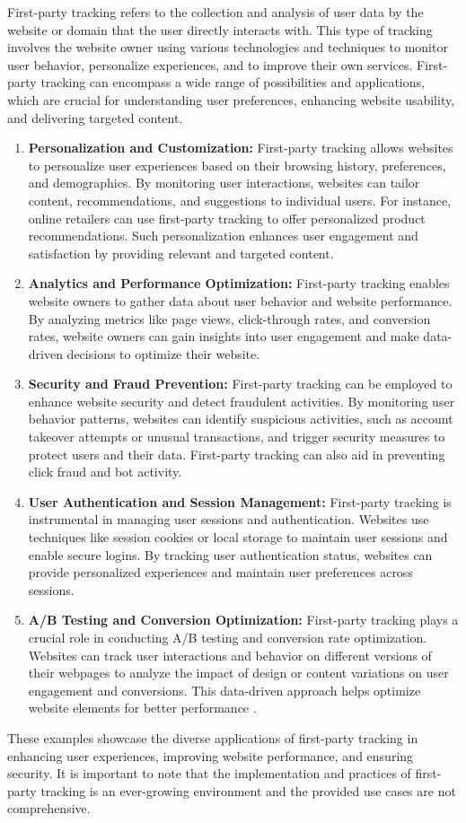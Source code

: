 First-party tracking refers to the collection and analysis of user data by the website or domain that the user directly
interacts with. This type of tracking involves the website owner using various technologies and techniques to monitor user
behavior, personalize experiences, and to improve their own services. First-party tracking can encompass a wide range of
possibilities and applications, which are crucial for understanding user preferences, enhancing website usability,
and delivering targeted content.
\begin{enumerate}
  \item{\textbf{Personalization and Customization:} First-party tracking allows websites to personalize user experiences based on their browsing history,
    preferences, and demographics. By monitoring user interactions, websites can tailor content,
    recommendations, and suggestions to individual users. For instance, online retailers can use first-party
    tracking to offer personalized product recommendations. Such personalization enhances user engagement
    and satisfaction by providing relevant and targeted content.
    }
  \item{\textbf{Analytics and Performance Optimization:} First-party tracking enables website owners to gather data about user behavior and website performance.
    By analyzing metrics like page views, click-through rates, and conversion rates, website owners can gain
    insights into user engagement and make data-driven decisions to optimize their website.
    }
  \item{\textbf{Security and Fraud Prevention:} First-party tracking can be employed to enhance website security and detect fraudulent
    activities. By monitoring user behavior patterns, websites can identify suspicious activities, such as account takeover
    attempts or unusual transactions, and trigger security measures to protect users and their data.
    First-party tracking can also aid in preventing click fraud and bot activity.
  }
  \item{\textbf{User Authentication and Session Management:} First-party tracking is instrumental in managing user sessions and authentication.
    Websites use techniques like session cookies or local storage to maintain user sessions and enable secure logins.
    By tracking user authentication status, websites can provide personalized experiences and maintain user preferences across sessions.
  }
  \item{\textbf{A/B Testing and Conversion Optimization:} First-party tracking plays a crucial role in conducting A/B testing and
    conversion rate optimization. Websites can track user interactions and behavior on different versions of their webpages
    to analyze the impact of design or content variations on user engagement and conversions. This data-driven approach
    helps optimize website elements for better performance \cite{siroker2015b}.
  }
\end{enumerate}
These examples showcase the diverse applications of first-party tracking in enhancing user experiences, improving website performance,
and ensuring security. It is important to note that the implementation and practices of first-party tracking is an ever-growing environment and the 
provided use cases are not comprehensive.
